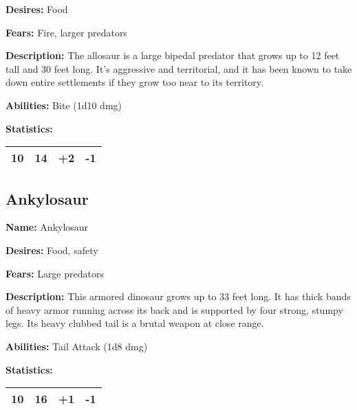 \begin{multicols}{2}
\textbf{Desires:} Food

\textbf{Fears:} Fire, larger predators

\textbf{Description:} The allosaur is a large bipedal predator that grows up to
12 feet tall and 30 feet long. It's aggressive and territorial, and it has been
known to take down entire settlements if they grow too near to its territory.

\textbf{Abilities:} Bite (1d10 dmg)

\textbf{Statistics:}

\begin{center}
{
\begin{xtabular}{|l|l|l|l|}
10 & 14 & +2 & -1 \\
\hline
\end{xtabular}
}
\end{center}

\subsection{Ankylosaur}

\textbf{Name:} Ankylosaur

\textbf{Desires:} Food, safety

\textbf{Fears:} Large predators

\textbf{Description:} This armored dinosaur grows up to 33 feet long. It has thick bands
of heavy armor running across its back and is supported by four strong, stumpy legs. Its
heavy clubbed tail is a brutal weapon at close range.

\textbf{Abilities:} Tail Attack (1d8 dmg)

\textbf{Statistics:}

\begin{center}
{
\begin{xtabular}{|l|l|l|l|}
10 & 16 & +1 & -1 \\
\hline
\end{xtabular}
}
\end{center}


\end{multicols}
